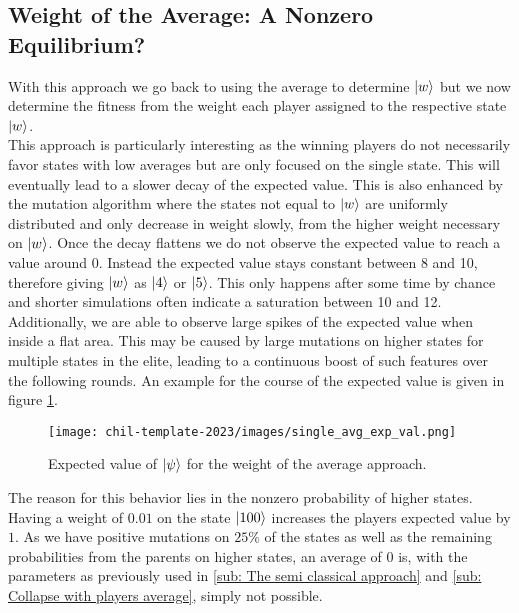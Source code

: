 \subsection{Weight of the Average: A Nonzero Equilibrium?}

With this approach we go back to using the average to determine $\ket{w}$ but we now determine the fitness from the weight each player assigned to the respective state $\ket{w}$.\\

This approach is particularly interesting as the winning players do not necessarily favor states with low averages but are only focused on the single state. This will eventually lead to a slower decay of the expected value. This is also enhanced by the mutation algorithm where the states not equal to $\ket{w}$ are uniformly distributed and only decrease in weight slowly, from the higher weight necessary on $\ket{w}$. Once the decay flattens we do not observe the expected value to reach a value around 0. Instead the expected value stays constant between 8 and 10, therefore giving $\ket{w}$ as $\ket{4}$ or $\ket{5}$. This only happens after some time by chance and shorter simulations often indicate a saturation between 10 and 12.\\

Additionally, we are able to observe large spikes of the expected value when inside a flat area. This may be caused by large mutations on higher states for multiple states in the elite, leading to a continuous boost of such features over the following rounds. An example for the course of the expected value is given in figure \ref{fig:single_avg_exp_val}.

\begin{figure}[h]
    \centering
    \texttt{[image: chil-template-2023/images/single\_avg\_exp\_val.png]}
    \caption{Expected value of $\ket{\psi}$ for the weight of the average approach.}
    \label{fig:single_avg_exp_val}
\end{figure}

The reason for this behavior lies in the nonzero probability of higher states. Having a weight of $0.01$ on the state $\ket{100}$ increases the players expected value by $1$. As we have positive mutations on $25\%$ of the states as well as the remaining probabilities from the parents on higher states, an average of $0$ is, with the parameters as previously used in \ref{sub: The semi classical approach} and \ref{sub: Collapse with players average}, simply not possible.\\

